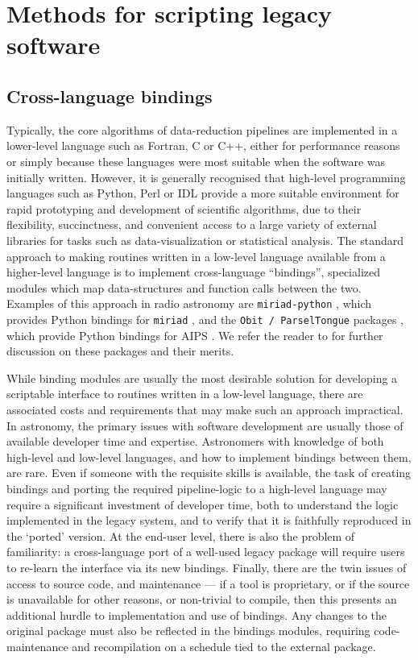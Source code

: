 \documentclass[5p,authoryear]{elsarticle}
\begin{document}
\section{Methods for scripting legacy software}
\label{sec:software}

\subsection{Cross-language bindings}
Typically, the core algorithms of data-reduction pipelines are 
implemented in a lower-level language such as Fortran, C or C++, either for 
performance reasons or simply because these languages were most suitable
when the software was initially written. However, it is generally recognised
that high-level programming languages such as Python, Perl or IDL provide a more
suitable environment for rapid prototyping and development of scientific 
algorithms, due to their flexibility, succinctness, and 
convenient access to a large variety of external libraries for tasks such
as data-visualization or statistical analysis.
The standard approach to making routines written in a low-level language 
available from a higher-level language is to 
implement cross-language ``bindings'', 
specialized modules which map data-structures and function calls between the two.
Examples of this approach in radio 
astronomy are \texttt{miriad-python} \citep{Williams2012}, which provides 
Python bindings for \texttt{miriad} \citep{Sault1995,Sault2011},
and the \texttt{Obit / ParselTongue} packages 
\citep{Cotton2008,Cotton2013,Kettenis2006, Kettenis2012}, which provide 
Python bindings for AIPS \citep{Fomalont1981}. 
We refer the reader to \cite{Williams2012} for further discussion on these
packages and their merits.

While binding modules are usually the most desirable solution for developing a scriptable interface to routines written in a low-level language, there are associated costs and requirements that may make such an approach impractical. 
In astronomy, the primary issues with software development are usually those of available developer time and expertise.
Astronomers with knowledge of both high-level and low-level languages, and how to implement bindings between them, are rare. 
Even if someone with the requisite skills is available, the task of creating bindings and porting the required pipeline-logic to a high-level language may require a significant investment of developer time, both to understand the logic implemented in the legacy system, and to verify that it is faithfully reproduced in the `ported' version. 
At the end-user level, there is also the problem of familiarity: a cross-language port of a well-used legacy package will require users to re-learn the interface via its new bindings. 
Finally, there are the twin issues of access to source code, and maintenance --- 
if a tool is proprietary, or if the source is unavailable for other reasons, or non-trivial to compile, then this presents an additional hurdle to implementation and use of bindings. 
Any changes to the original package must also be reflected in the bindings modules, requiring code-maintenance and recompilation on a schedule tied to the external package.
\end{document}

